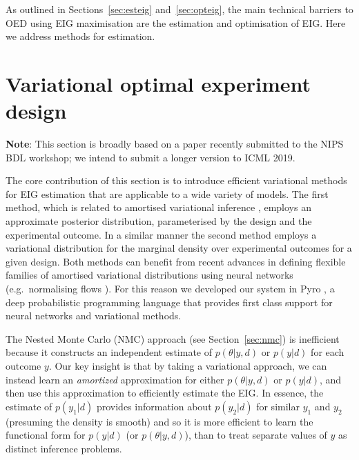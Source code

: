 As outlined in Sections~\ref{sec:esteig} and~\ref{sec:opteig}, the main technical barriers to OED using EIG maximisation are the estimation and optimisation of EIG. Here we address methods for estimation.

\section{Variational optimal experiment design}
\label{sec:voed}
\textbf{Note}: This section is broadly based on a paper recently submitted to the NIPS BDL workshop; we intend to submit a longer version to ICML 2019.
\bigskip

The core contribution of this section is to introduce efficient variational methods for EIG estimation that are applicable to a wide variety of models.
The first method, which is related to amortised variational inference \cite{dayan1995helmholtz,kingma2014auto,paige2016inference,rezende2014stochastic,stuhlmuller2013learning}, employs an approximate posterior distribution, parameterised by the design and the experimental outcome. In a similar manner the second method employs a variational distribution for the marginal density over experimental outcomes for a given design. 
Both methods can benefit from recent advances in defining flexible families of amortised variational distributions 
using neural networks (e.g.~normalising flows \cite{rezende2015variational,tabak2013family}). For this reason we developed our system in Pyro \cite{pyro}, a deep probabilistic programming language that provides first class support for neural networks and variational methods.  

The Nested Monte Carlo (NMC) approach (see Section~\ref{sec:nmc}) is inefficient because it constructs an independent estimate of $p(\theta | y, d)$ or $p(y|d)$ for each outcome $y$.
Our key insight is that by taking a variational approach, we can instead learn an \emph{amortized} approximation
for either $p(\theta|y,d)$ or $p(y|d)$, and then use this approximation to efficiently estimate the EIG.  In
essence, the estimate of $p(y_1|d)$ provides information about $p(y_2|d)$ for similar $y_1$ and $y_2$ (presuming
the density is smooth) and so it is more efficient to learn the functional form for $p(y|d)$ (or $p(\theta|y,d)$),
than to treat separate values of $y$ as distinct inference problems.

